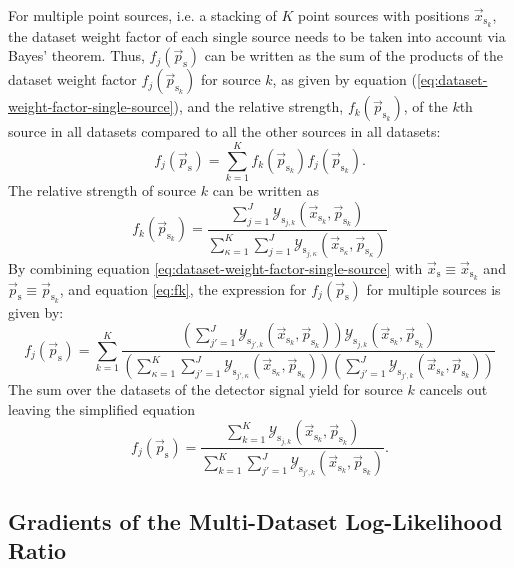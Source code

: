 \documentclass{article}
\newcommand{\ps}{\vec{p}_{\mathrm{s}}}
\newcommand{\psk}{\vec{p}_{\mathrm{s}_k}}
\newcommand{\xs}{\vec{x}_{\mathrm{s}}}
\newcommand{\xsk}{\vec{x}_{\mathrm{s}_k}}
\begin{document}
For multiple point sources, i.e. a stacking of $K$ point sources with positions
$\xsk$, the dataset weight factor of each single source needs
to be taken into account via Bayes' theorem. Thus, $f_{j}(\ps)$ can be written
as the sum of the products of the dataset weight factor $f_{j}(\psk)$ for
source $k$, as given by equation (\ref{eq:dataset-weight-factor-single-source}),
and the relative strength, $f_{k}(\psk)$, of the $k$th source in all datasets
compared to all the other sources in all datasets:
\begin{equation}
 f_{j}(\ps) = \sum_{k=1}^{K} f_{k}(\psk) f_{j}(\psk).
\end{equation}
The relative strength of source $k$ can be written as
\begin{equation}
 f_{k}(\psk) = \frac{\sum_{j=1}^{J} \mathcal{Y}_{\mathrm{s}_{j,k}}(\xsk,\psk)}{\sum_{\kappa=1}^{K} \sum_{j=1}^{J} \mathcal{Y}_{\mathrm{s}_{j,\kappa}}(\vec{x}_{\mathrm{s}_\kappa},\vec{p}_{\mathrm{s}_\kappa}) }
 \label{eq:fk}
\end{equation}
By combining equation \ref{eq:dataset-weight-factor-single-source} with $\xs \equiv \xsk$
and $\ps \equiv \psk$, and equation \ref{eq:fk}, the expression for
$f_{j}(\ps)$ for multiple sources is given by:
\begin{equation}
 f_{j}(\ps) = \sum_{k=1}^{K}
    \frac{\left(\sum_{j'=1}^{J} \mathcal{Y}_{\mathrm{s}_{j',k}}(\xsk,\psk)\right) \mathcal{Y}_{\mathrm{s}_{j,k}}(\xsk,\psk)}
         {\left(\sum_{\kappa=1}^{K} \sum_{j'=1}^{J} \mathcal{Y}_{\mathrm{s}_{j',\kappa}}(\vec{x}_{\mathrm{s}_\kappa},\vec{p}_{\mathrm{s}_\kappa})\right) \left( \sum_{j'=1}^{J} \mathcal{Y}_{\mathrm{s}_{j',k}}(\xsk,\psk) \right)}
\end{equation}
The sum over the datasets of the detector signal yield for source $k$ cancels
out leaving the simplified equation
\begin{equation}
 f_{j}(\ps) = \frac{\sum_{k=1}^{K} \mathcal{Y}_{\mathrm{s}_{j,k}}(\xsk,\psk)}
                   {\sum_{k=1}^{K} \sum_{j'=1}^{J} \mathcal{Y}_{\mathrm{s}_{j',k}}(\xsk,\psk)}.
 \label{eq:dataset-weight-factor-multiple-sources}
\end{equation}

\subsection{Gradients of the Multi-Dataset Log-Likelihood Ratio}
\end{document}
